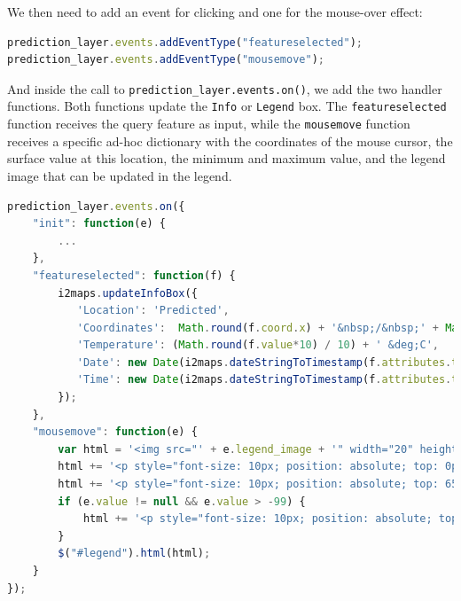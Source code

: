 \documentclass[11pt]{article}
\begin{document}
We then need to add an event for clicking and one for the mouse-over effect:

\begin{lstlisting}[language=JavaScript]
prediction_layer.events.addEventType("featureselected");
prediction_layer.events.addEventType("mousemove");
\end{lstlisting}

And inside the call to \texttt{prediction\_layer.events.on()}, we add the two handler functions. Both functions update the \texttt{Info} or \texttt{Legend} box. The \texttt{featureselected} function receives the query feature as input, while the \texttt{mousemove} function receives a specific ad-hoc dictionary with the coordinates of the mouse cursor, the surface value at this location, the minimum and maximum value, and the legend image that can be updated in the legend.

\begin{lstlisting}[language=JavaScript]
prediction_layer.events.on({
    "init": function(e) {
        ...
    },
    "featureselected": function(f) {
        i2maps.updateInfoBox({
           'Location': 'Predicted',
           'Coordinates':  Math.round(f.coord.x) + '&nbsp;/&nbsp;' + Math.round(f.coord.y),
           'Temperature': (Math.round(f.value*10) / 10) + ' &deg;C',
           'Date': new Date(i2maps.dateStringToTimestamp(f.attributes.time)).toLocaleDateString(),
           'Time': new Date(i2maps.dateStringToTimestamp(f.attributes.time)).toLocaleTimeString()
        });
    },
    "mousemove": function(e) {
        var html = '<img src="' + e.legend_image + '" width="20" height="80" style="float:left"/>';
        html += '<p style="font-size: 10px; position: absolute; top: 0px; left: 40px">Max: ' + e.value_range[1].toFixed(1) + ' &deg;C</p>';
        html += '<p style="font-size: 10px; position: absolute; top: 65px; left: 40px">Min: ' + e.value_range[0].toFixed(1) + " &deg;C</p>";
        if (e.value != null && e.value > -99) {
            html += '<p style="font-size: 10px; position: absolute; top: 32px; left: 40px">Prediction: ' + e.value.toFixed(1) + " &deg;C</p>";
        }
        $("#legend").html(html);
    }
});
\end{lstlisting}
\end{document}
